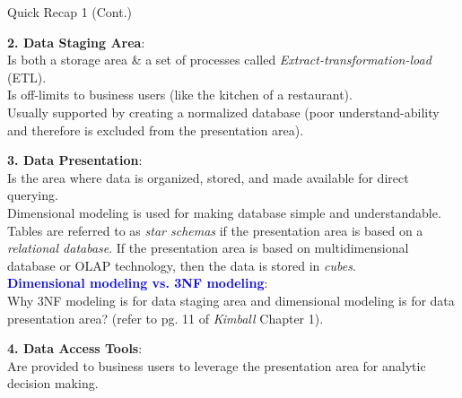 \begin{frame}[fragile]{Quick Recap 1 (Cont.)}\vspace{-7pt}
\begin{small}
	\textbf{2. Data Staging Area}:\\
	Is both a storage area \& a set of processes called \textit{Extract-transformation-load} (ETL).\\
	Is off-limits to business users (like the kitchen of a restaurant).\\
	Usually supported by creating a normalized database (poor understand-ability and therefore is excluded from the presentation area).\\\vspace{5pt}
	
	\textbf{3. Data Presentation}:\\
	Is the area where data is organized, stored, and made available for direct querying.\\
	Dimensional modeling is used for making database simple and understandable.\\
	Tables are referred to as \textit{star schemas} if the presentation area is based on a \textit{relational database}.
	If the presentation area is based on multidimensional database or OLAP technology, then the data is stored in \textit{cubes}.
	\\\vspace{3pt}
	\textcolor{blue}{\textbf{Dimensional modeling vs. 3NF modeling}}: \\
	Why 3NF modeling is for data staging area and dimensional modeling is for data presentation area? (refer to pg. 11 of \textit{Kimball} Chapter 1).\\\vspace{5pt}
	
	\textbf{4. Data Access Tools}:\\
	Are provided to business users to leverage the presentation area for analytic decision making.
	
\end{small}
\end{frame}

